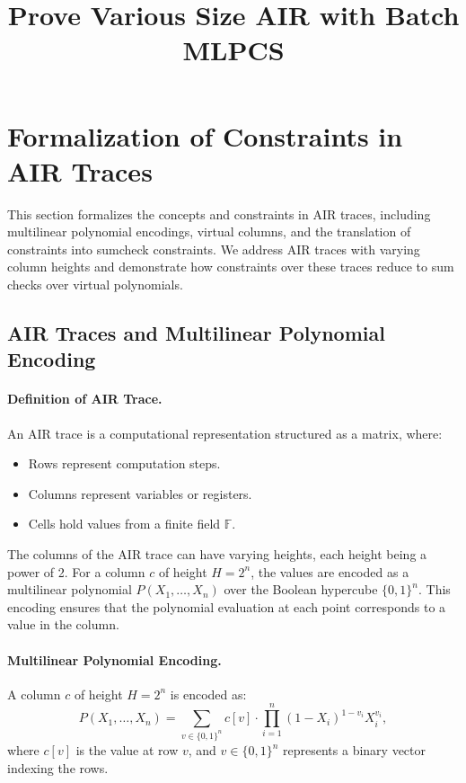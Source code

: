 \documentclass{article}
\title{Prove Various Size AIR with Batch MLPCS}
\author{}
\date{}
\begin{document}
\maketitle
\section{Formalization of Constraints in AIR Traces}

This section formalizes the concepts and constraints in AIR traces, including multilinear polynomial encodings, virtual columns, and the translation of constraints into sumcheck constraints. We address AIR traces with varying column heights and demonstrate how constraints over these traces reduce to sum checks over virtual polynomials.

\subsection{AIR Traces and Multilinear Polynomial Encoding}

\paragraph{Definition of AIR Trace.} An AIR trace is a computational representation structured as a matrix, where:
\begin{itemize}
    \item Rows represent computation steps.
    \item Columns represent variables or registers.
    \item Cells hold values from a finite field \( \mathbb{F} \).
\end{itemize}

The columns of the AIR trace can have varying heights, each height being a power of 2. For a column \( c \) of height \( H = 2^n \), the values are encoded as a multilinear polynomial \( P(X_1, \dots, X_n) \) over the Boolean hypercube \( \{0, 1\}^n \). This encoding ensures that the polynomial evaluation at each point corresponds to a value in the column.

\paragraph{Multilinear Polynomial Encoding.} A column \( c \) of height \( H = 2^n \) is encoded as:
\[
P(X_1, \dots, X_n) = \sum_{v \in \{0, 1\}^n} c[v] \cdot \prod_{i=1}^n (1 - X_i)^{1-v_i} X_i^{v_i},
\]
where \( c[v] \) is the value at row \( v \), and \( v \in \{0, 1\}^n \) represents a binary vector indexing the rows.
\end{document}
